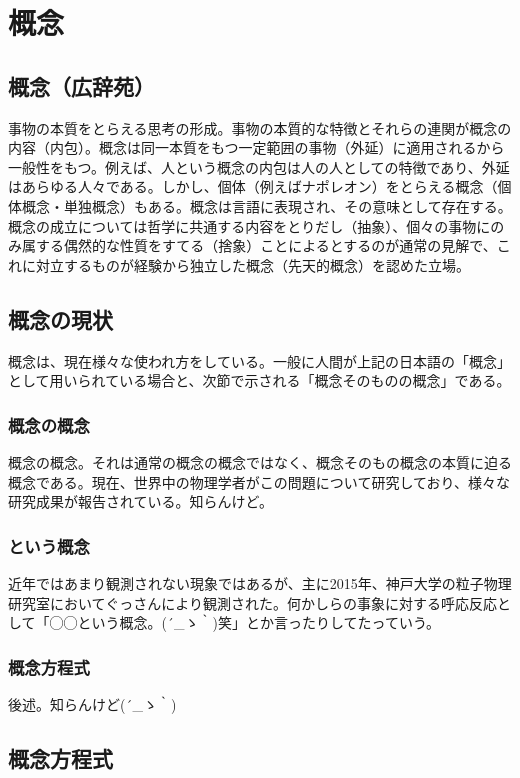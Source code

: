 \section{概念}

\subsection{概念（広辞苑）}
事物の本質をとらえる思考の形成。事物の本質的な特徴とそれらの連関が概念の内容（内包）。概念は同一本質をもつ一定範囲の事物（外延）に適用されるから一般性をもつ。例えば、人という概念の内包は人の人としての特徴であり、外延はあらゆる人々である。しかし、個体（例えばナポレオン）をとらえる概念（個体概念・単独概念）もある。概念は言語に表現され、その意味として存在する。概念の成立については哲学に共通する内容をとりだし（抽象）、個々の事物にのみ属する偶然的な性質をすてる（捨象）ことによるとするのが通常の見解で、これに対立するものが経験から独立した概念（先天的概念）を認めた立場。\\

\subsection{概念の現状}
概念は、現在様々な使われ方をしている。一般に人間が上記の日本語の「概念」として用いられている場合と、次節で示される「概念そのものの概念」である。\\

\subsubsection{概念の概念}
概念の概念。それは通常の概念の概念ではなく、概念そのもの概念の本質に迫る概念である。現在、世界中の物理学者がこの問題について研究しており、様々な研究成果が報告されている。知らんけど。

\subsubsection{という概念}
近年ではあまり観測されない現象ではあるが、主に2015年、神戸大学の粒子物理研究室においてぐっさんにより観測された。何かしらの事象に対する呼応反応として「◯◯という概念。{\sf (´\_ゝ｀)}笑」とか言ったりしてたっていう。

\subsubsection{概念方程式}
後述。知らんけど\sf(´\_ゝ｀)

\newpage
\subsection{概念方程式}
